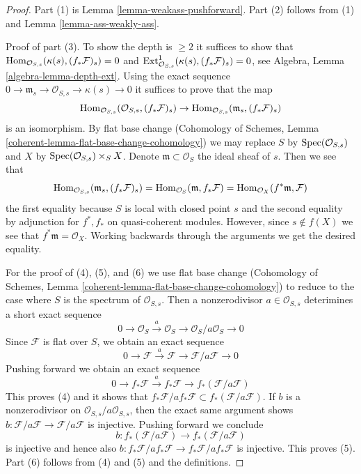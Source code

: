 \begin{proof}
Part (1) is Lemma \ref{lemma-weakass-pushforward}.
Part (2) follows from (1) and Lemma \ref{lemma-ass-weakly-ass}.

\medskip\noindent
Proof of part (3). To show the depth is $\geq 2$ it suffices to show that
$\mathop{\mathrm{Hom}}\nolimits_{\mathcal{O}_{S, s}}(\kappa(s), (f_*\mathcal{F})_s) = 0$ and
$\mathop{\mathrm{Ext}}\nolimits^1_{\mathcal{O}_{S, s}}(\kappa(s), (f_*\mathcal{F})_s) = 0$, see
Algebra, Lemma \ref{algebra-lemma-depth-ext}.
Using the exact sequence
$0 \to \mathfrak m_s \to \mathcal{O}_{S, s} \to \kappa(s) \to 0$
it suffices to prove that the map
$$
\mathop{\mathrm{Hom}}\nolimits_{\mathcal{O}_{S, s}}(\mathcal{O}_{S, s}, (f_*\mathcal{F})_s)
\to
\mathop{\mathrm{Hom}}\nolimits_{\mathcal{O}_{S, s}}(\mathfrak m_s, (f_*\mathcal{F})_s)
$$
is an isomorphism. By flat base change (Cohomology of Schemes, Lemma
\ref{coherent-lemma-flat-base-change-cohomology})
we may replace $S$ by
$\mathop{\mathrm{Spec}}(\mathcal{O}_{S, s})$ and $X$ by $\mathop{\mathrm{Spec}}(\mathcal{O}_{S, s}) \times_S X$.
Denote $\mathfrak m \subset \mathcal{O}_S$ the ideal sheaf of $s$.
Then we see that
$$
\mathop{\mathrm{Hom}}\nolimits_{\mathcal{O}_{S, s}}(\mathfrak m_s, (f_*\mathcal{F})_s) =
\mathop{\mathrm{Hom}}\nolimits_{\mathcal{O}_S}(\mathfrak m, f_*\mathcal{F}) =
\mathop{\mathrm{Hom}}\nolimits_{\mathcal{O}_X}(f^*\mathfrak m, \mathcal{F})
$$
the first equality because $S$ is local with closed point $s$
and the second equality
by adjunction for $f^*, f_*$ on quasi-coherent modules. However, since
$s \not \in f(X)$ we see that $f^*\mathfrak m = \mathcal{O}_X$.
Working backwards through the arguments we get the desired equality.

\medskip\noindent
For the proof of (4), (5), and (6) we use flat base change
(Cohomology of Schemes, Lemma
\ref{coherent-lemma-flat-base-change-cohomology})
to reduce to the case where $S$ is the spectrum of
$\mathcal{O}_{S, s}$.
Then a nonzerodivisor $a \in \mathcal{O}_{S, s}$
deterimines a short exact sequence
$$
0 \to \mathcal{O}_S \xrightarrow{a} \mathcal{O}_S \to
\mathcal{O}_S/a \mathcal{O}_S \to 0
$$
Since $\mathcal{F}$ is flat over $S$, we obtain an exact sequence
$$
0 \to \mathcal{F} \xrightarrow{a} \mathcal{F} \to
\mathcal{F}/a\mathcal{F} \to 0
$$
Pushing forward we obtain an exact sequence
$$
0 \to f_*\mathcal{F} \xrightarrow{a} f_*\mathcal{F} \to
f_*(\mathcal{F}/a\mathcal{F})
$$
This proves (4) and it shows that
$f_*\mathcal{F}/ af_*\mathcal{F} \subset f_*(\mathcal{F}/a\mathcal{F})$.
If $b$ is a nonzerodivisor on
$\mathcal{O}_{S, s}/a\mathcal{O}_{S, s}$, then the exact same argument shows
$b : \mathcal{F}/a\mathcal{F} \to \mathcal{F}/a\mathcal{F}$
is injective. Pushing forward we conclude
$$
b : f_*(\mathcal{F}/a\mathcal{F}) \to f_*(\mathcal{F}/a\mathcal{F})
$$
is injective and hence also
$b : f_*\mathcal{F}/ af_*\mathcal{F} \to f_*\mathcal{F}/ af_*\mathcal{F}$
is injective. This proves (5). Part (6) follows from
(4) and (5) and the definitions.
\end{proof}











